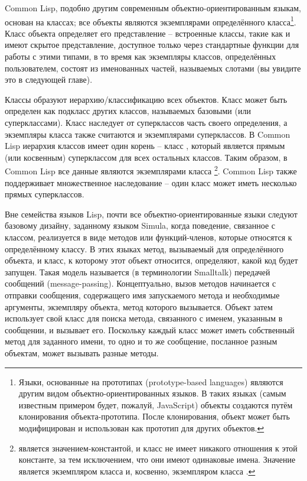 Common Lisp, подобно другим современным объектно-ориентированным языкам, основан на
классах; все объекты являются экземплярами определённого класса\footnote{Языки, основанные
  на прототипах (prototype-based languages) являются другим видом объектно-ориентированных
  языков. В таких языках (самым известным примером будет, пожалуй, JavaScript) объекты
  создаются путём клонирования объекта-прототипа. После клонирования, объект может быть
  модифицирован и использован как прототип для других объектов.}.  Класс объекта
определяет его представление -- встроенные классы, такие как  и 
имеют скрытое представление, доступное только через стандартные функции для работы с этими
типами, в то время как экземпляры классов, определённых пользователем, состоят из
именованных частей, называемых слотами (вы увидите это в следующей главе).

Классы образуют иерархию/классификацию всех объектов.  Класс может быть определен как
подкласс других классов, называемых базовыми (или суперклассами).  Класс наследует от
суперклассов часть своего определения, а экземпляры класса также считаются и экземплярами
суперклассов.  В Common Lisp иерархия классов имеет один корень -- класс , который
является прямым (или косвенным) суперклассом для всех остальных классов.  Таким образом, в
Common Lisp все данные являются экземплярами класса \footnote{ является
  значением-константой, и класс  не имеет никакого отношения к этой константе, за
  тем исключением, что они имеют одинаковые имена.  Значение  является экземпляром
  класса  и, косвенно, экземпляром класса .}.  Common Lisp также
поддерживает множественное наследование -- один класс может иметь несколько прямых
суперклассов.

Вне семейства языков Lisp, почти все объектно-ориентированные языки следуют базовому
дизайну, заданному языком Simula, когда поведение, связанное с классом, реализуется в виде
методов или функций-членов, которые относятся к определённому классу.  В этих языках
метод, вызываемый для определённого объекта, и класс, к которому этот объект относится,
определяют, какой код будет запущен.  Такая модель называется (в терминологии Smalltalk)
передачей сообщений (message-passing).  Концептуально, вызов методов начинается с отправки
сообщения, содержащего имя запускаемого метода и необходимые аргументы, экземпляру
объекта, метод которого вызывается.  Объект затем использует свой класс для поиска метода,
связанного с именем, указанным в сообщении, и вызывает его.  Поскольку каждый класс может
иметь собственный метод для заданного имени, то одно и то же сообщение, посланное разным
объектам, может вызывать разные методы.

